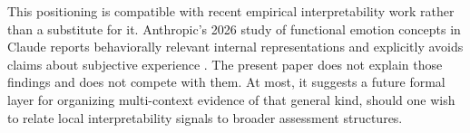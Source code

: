 \documentclass[11pt]{amsart}
\numberwithin{equation}{section}
\theoremstyle{definition}
\theoremstyle{remark}
\begin{document}
This positioning is compatible with recent empirical interpretability work rather than a substitute for it. Anthropic's 2026 study of functional emotion concepts in Claude reports behaviorally relevant internal representations and explicitly avoids claims about subjective experience \cite{Anthropic2026Emotion}. The present paper does not explain those findings and does not compete with them. At most, it suggests a future formal layer for organizing multi-context evidence of that general kind, should one wish to relate local interpretability signals to broader assessment structures.



\end{document}
